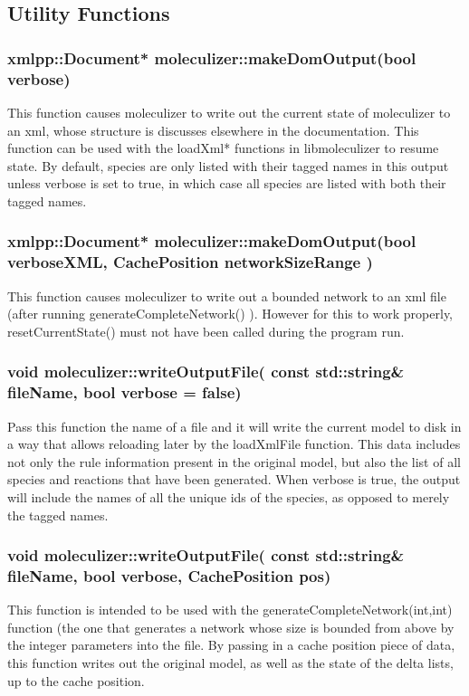 \subsection{Utility Functions}
\subsubsection{xmlpp::Document* moleculizer::makeDomOutput(bool verbose)}
This function causes moleculizer to write out the current state of
moleculizer to an xml, whose structure is discusses elsewhere in the
documentation.  This function can be used with the loadXml* functions
in libmoleculizer to resume state.  By default, species are only
listed with their tagged names in this output unless verbose is set
to true, in which case all species are listed with both their tagged
names.

\subsubsection{xmlpp::Document* moleculizer::makeDomOutput(bool verboseXML, CachePosition
networkSizeRange )}
This function causes moleculizer to write out a bounded network to an
xml file (after running generateCompleteNetwork() ).  However for this
to work properly, resetCurrentState() must not have been called during
the program run.  

\subsubsection{void moleculizer::writeOutputFile( const std::string\& fileName, bool verbose =
false) }

Pass this function the name of a file and it will write the
current model to disk in a way that allows reloading later by the
loadXmlFile function.  This data includes not only the rule
information present in the original model, but also the list of all
species and reactions that have been generated.  When verbose is true,
the output will include the names of all the unique ids of the
species, as opposed to merely the tagged names.

\subsubsection{void moleculizer::writeOutputFile( const std::string\& fileName, bool verbose,
CachePosition pos)}
This function is intended to be used with the
generateCompleteNetwork(int,int) function (the one that generates a
network whose size is bounded from above by the integer parameters
into the file.  By passing in a cache position piece of data, this
function writes out the original model, as well as the state of the
delta lists, up to the cache position.  

